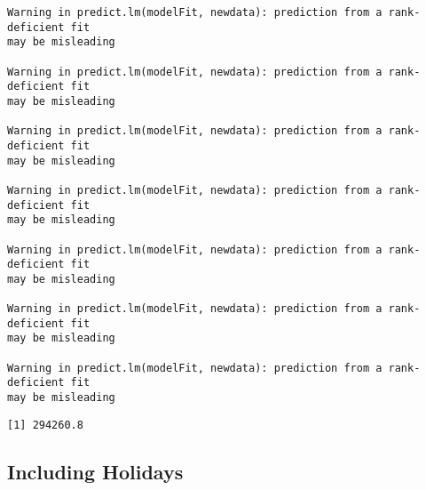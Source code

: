 \documentclass[
  letterpaper,
  DIV=11,
  numbers=noendperiod]{scrartcl}
\begin{document}
\begin{verbatim}
Warning in predict.lm(modelFit, newdata): prediction from a rank-deficient fit
may be misleading

Warning in predict.lm(modelFit, newdata): prediction from a rank-deficient fit
may be misleading

Warning in predict.lm(modelFit, newdata): prediction from a rank-deficient fit
may be misleading

Warning in predict.lm(modelFit, newdata): prediction from a rank-deficient fit
may be misleading

Warning in predict.lm(modelFit, newdata): prediction from a rank-deficient fit
may be misleading

Warning in predict.lm(modelFit, newdata): prediction from a rank-deficient fit
may be misleading

Warning in predict.lm(modelFit, newdata): prediction from a rank-deficient fit
may be misleading
\end{verbatim}

\begin{verbatim}
[1] 294260.8
\end{verbatim}

\hypertarget{including-holidays}{%
\subsection{Including Holidays}\label{including-holidays}}
\end{document}
